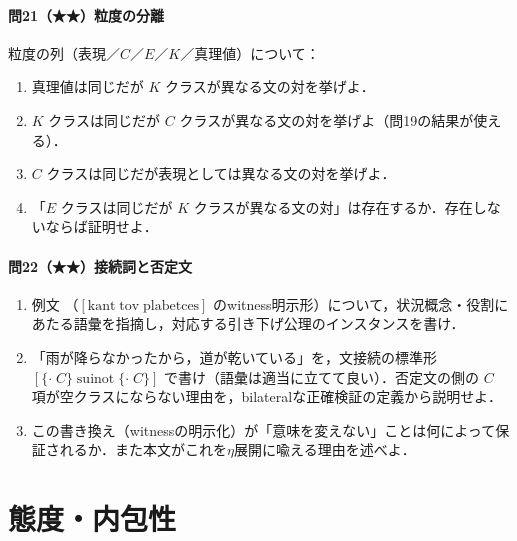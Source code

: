 \documentclass[../../main-detail.tex]{subfiles}
\begin{document}
\paragraph{問21（★★）粒度の分離}
粒度の列（表現／$C$／$E$／$K$／真理値）について：
\begin{enumerate}[label=(\alph*)]
    \item 真理値は同じだが $K$ クラスが異なる文の対を挙げよ．
    \item $K$ クラスは同じだが $C$ クラスが異なる文の対を挙げよ（問19の結果が使える）．
    \item $C$ クラスは同じだが表現としては異なる文の対を挙げよ．
    \item 「$E$ クラスは同じだが $K$ クラスが異なる文の対」は存在するか．存在しないならば証明せよ．
\end{enumerate}

\paragraph{問22（★★）接続詞と否定文}
\begin{enumerate}[label=(\alph*)]
    \item 例文 （$[\text{kant}\; \text{tov}\; \text{plabetces}]$ のwitness明示形）について，状況概念・役割にあたる語彙を指摘し，対応する引き下げ公理のインスタンスを書け．
    \item 「雨が降らなかったから，道が乾いている」を，文接続の標準形 $[\{\cdot\; C\}\;\mathrm{suinot}\;\{\cdot\; C\}]$ で書け（語彙は適当に立てて良い）．否定文の側の $C$ 項が空クラスにならない理由を，bilateralな正確検証の定義から説明せよ．
    \item この書き換え（witnessの明示化）が「意味を変えない」ことは何によって保証されるか．また本文がこれを$\eta$展開に喩える理由を述べよ．
\end{enumerate}

\section{態度・内包性}
\end{document}
